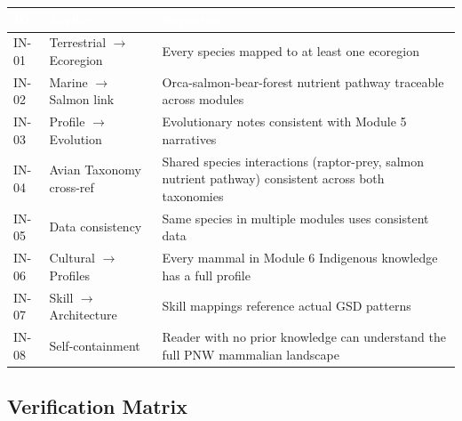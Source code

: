 \documentclass[11pt,letterpaper]{article}
\newcommand{\tableheader}[1]{\textbf{\sffamily\textcolor{white}{#1}}}
\begin{document}
\begin{center}
\begin{tabularx}{\textwidth}{C{1.2cm}L{3cm}X}
\toprule
{}
\tableheader{ID} & \tableheader{Verifies} & \tableheader{Expected} \\
\midrule
IN-01 & Terrestrial $\rightarrow$ Ecoregion & Every species mapped to at least one ecoregion \\
IN-02 & Marine $\rightarrow$ Salmon link & Orca-salmon-bear-forest nutrient pathway traceable across modules \\
IN-03 & Profile $\rightarrow$ Evolution & Evolutionary notes consistent with Module 5 narratives \\
IN-04 & Avian Taxonomy cross-ref & Shared species interactions (raptor-prey, salmon nutrient pathway) consistent across both taxonomies \\
IN-05 & Data consistency & Same species in multiple modules uses consistent data \\
IN-06 & Cultural $\rightarrow$ Profiles & Every mammal in Module 6 Indigenous knowledge has a full profile \\
IN-07 & Skill $\rightarrow$ Architecture & Skill mappings reference actual GSD patterns \\
IN-08 & Self-containment & Reader with no prior knowledge can understand the full PNW mammalian landscape \\
\bottomrule
\end{tabularx}
\end{center}

\subsection{Verification Matrix}
\end{document}
